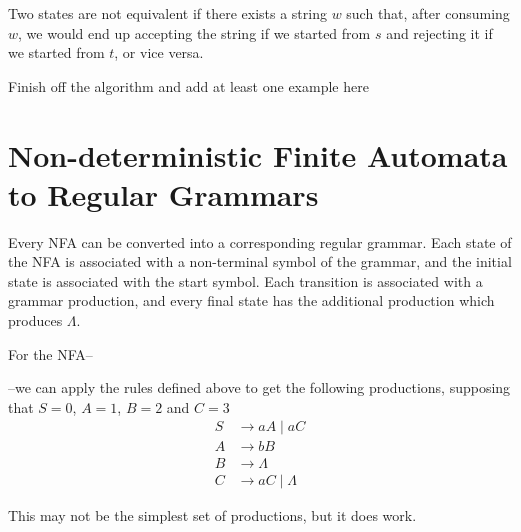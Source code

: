 Two states are not equivalent if there exists a string $w$ such that, after consuming $w$, we would end up accepting the
 string if we started from $s$ and rejecting it if we started from $t$, or vice versa.

{\Huge Finish off the algorithm and add at least one example here}




\section*{Non-deterministic Finite Automata to Regular Grammars}

Every NFA can be converted into a corresponding regular grammar. Each state of the NFA is associated with a non-terminal
 symbol of the grammar, and the initial state is associated with the start symbol. Each transition is associated with
 a grammar production, and every final state has the additional production which produces $\Lambda$.

\begin{example*}{}{}
  For the NFA--
  \begin{center}
  \end{center}

  --we can apply the rules defined above to get the following productions, supposing that $S=0$, $A=1$, $B=2$ and $C=3$
  \begin{align*}
    S &\rightarrow aA \mid aC\\
    A &\rightarrow bB\\
    B &\rightarrow \Lambda\\
    C &\rightarrow aC \mid \Lambda
  \end{align*}

  This may not be the simplest set of productions, but it does work.
\end{example*}

